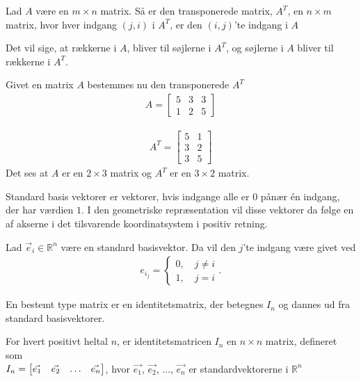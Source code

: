 \begin{defn}
Lad $A$ være en $m \times n$ matrix. Så er den transponerede matrix, $A^T$, en $n \times m$ matrix, hvor hver indgang $(j,i)$ i $A^T$, er den $(i,j)$'te indgang i $A$
\label{def:(transmatrix)} 
\end{defn}
Det vil sige, at rækkerne i $A$, bliver til søjlerne i $A^T$, og søjlerne i $A$ bliver til rækkerne i $A^T$.

\begin{eks}
Givet en matrix $A$ bestemmes nu den transponerede $A^T$
\begin{align*}
A = \begin{bmatrix}
	5 & 3 & 3 \\
	1 & 2 & 5
\end{bmatrix}
\end{align*}

\begin{align*}
A^T = \begin{bmatrix}
	5 & 1  \\
	3 & 2  \\
	3 & 5
\end{bmatrix}
\end{align*}
Det ses at $A$ er en $2 \times 3$ matrix og $A^T$ er en $3 \times 2$ matrix. 
\end{eks}


Standard basis vektorer er vektorer, hvis indgange alle er $0$ pånær én indgang, der har værdien $1$. I den geometriske repræsentation vil disse vektorer da følge en af akserne i det tilsvarende koordinatsystem i positiv retning.

\begin{defn}
Lad $\vec{e}_{i}\in\mathds{R}^n$ være en standard basisvektor. Da vil den $j$'te indgang være givet ved
\begin{align*}
e_{i_{j}}=\begin{cases} 0, \quad j \neq i
\\ 1 , \quad j = i \end{cases}.
\end{align*}

\end{defn}

En bestemt type matrix er en identitetsmatrix, der betegnes $I_n$ og dannes ud fra standard basisvektorer. 

\begin{defn} [Identitetsmatrix]
For hvert positivt heltal $n$, er identitetsmatricen $I_n$ en $n \times n$ matrix, defineret som\\ $I_n = \begin{bmatrix} \vec{e_1} & \vec{e_2} & \dots &  \vec{e_n} \end{bmatrix}$, hvor $\vec{e_1}$, $\vec{e_2}$, $\dots$, $\vec{e_n}$ er standardvektorerne i $\mathds{R}^n$
\label{def:imatrix}
\end{defn}

